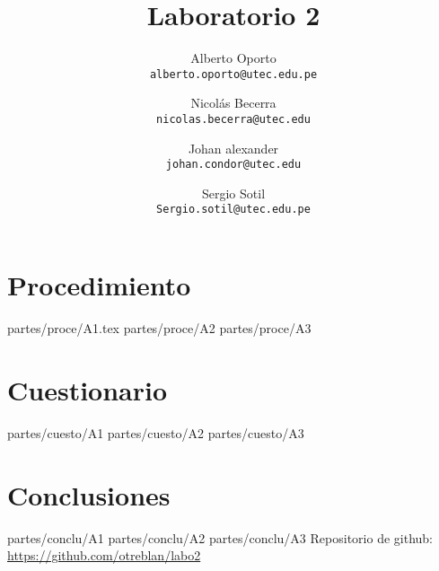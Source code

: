 \documentclass[12pt]{article}
\title{\textbf{Laboratorio 2}}
\author{
		Alberto Oporto\\
		\texttt{alberto.oporto@utec.edu.pe}\\
		\and Nicolás Becerra\\
		\texttt{nicolas.becerra@utec.edu}\\
		\and Johan alexander\\
		\texttt{johan.condor@utec.edu}\\
		\and Sergio Sotil\\
		\texttt{Sergio.sotil@utec.edu.pe}\\
		}
\begin{document}
\maketitle
\thispagestyle{fancy}

\section{Procedimiento}%
\label{sec:procedimiento}

{partes/proce/A1.tex}
{partes/proce/A2}
{partes/proce/A3}

\section{Cuestionario}%
\label{sec:cuestionario}

{partes/cuesto/A1}
{partes/cuesto/A2}
{partes/cuesto/A3}

\section{Conclusiones}%
\label{sec:conclusiones}

{partes/conclu/A1}
{partes/conclu/A2}
{partes/conclu/A3}
\vfill
Repositorio de github: \url{https://github.com/otreblan/labo2}
\end{document}
